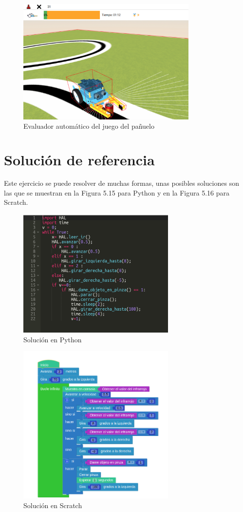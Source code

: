  \begin{figure}[H]
  \centering
 \includegraphics[width=0.8\textwidth, height=0.5\textwidth]{chapters/images/evaluadorpinza.png}
  \caption{Evaluador automático del juego del pañuelo}
\end{figure}


\section{Solución de referencia}
Este ejercicio se puede resolver de muchas formas, unas posibles soluciones son las que se muestran en la Figura 5.15 para Python y  en la Figura 5.16 para Scratch. 

\begin{figure}[H]
    \centering
    \includegraphics[width=0.7\textwidth, height=0.55\textwidth]{chapters/images/solucionppython.png}
    \caption{Solución en Python}
    \label{fig:my_label}
\end{figure}

\begin{figure}[H]
    \centering
    \includegraphics[width=0.7\textwidth, height=0.55\textwidth]{chapters/images/solucionpscratch.png}
    \caption{Solución en Scratch}
    \label{fig:my_label}
\end{figure}